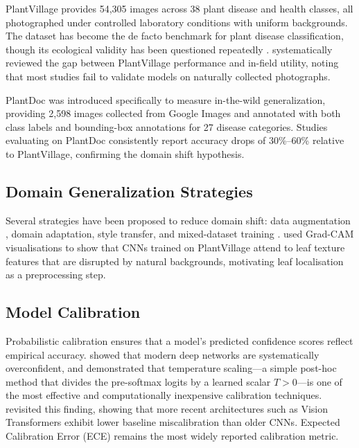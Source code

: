 \documentclass[pdflatex,sn-mathphys-num]{sn-jnl}
\begin{document}
PlantVillage \citep{hughes2015plantvillage} provides 54{,}305 images across 38 plant
disease and health classes, all photographed under controlled laboratory conditions with
uniform backgrounds. The dataset has become the de facto benchmark for plant disease
classification, though its ecological validity has been questioned repeatedly
\citep{barbedo2022review,toda2019deep}. \citet{dsouza2021generalization} systematically
reviewed the gap between PlantVillage performance and in-field utility, noting that most
studies fail to validate models on naturally collected photographs.

PlantDoc \citep{singh2020plant} was introduced specifically to measure in-the-wild
generalization, providing 2{,}598 images collected from Google Images and annotated with
both class labels and bounding-box annotations for 27 disease categories. Studies
evaluating on PlantDoc consistently report accuracy drops of 30\%--60\% relative to
PlantVillage, confirming the domain shift hypothesis.

\subsection{Domain Generalization Strategies}

Several strategies have been proposed to reduce domain shift: data augmentation
\citep{shorten2019survey}, domain adaptation, style transfer, and mixed-dataset
training \citep{kwak2019effect}. \citet{toda2019deep} used Grad-CAM visualisations
\citep{selvaraju2017gradcam} to show that CNNs trained on PlantVillage attend to leaf
texture features that are disrupted by natural backgrounds, motivating leaf localisation
as a preprocessing step.

\subsection{Model Calibration}

Probabilistic calibration ensures that a model's predicted confidence scores reflect
empirical accuracy. \citet{guo2017calibration} showed that modern deep networks are
systematically overconfident, and demonstrated that temperature scaling---a simple
post-hoc method that divides the pre-softmax logits by a learned scalar $T > 0$---is
one of the most effective and computationally inexpensive calibration techniques.
\citet{minderer2021calibration} revisited this finding, showing that more recent
architectures such as Vision Transformers exhibit lower baseline miscalibration than
older CNNs. Expected Calibration Error (ECE) \citep{niculescu2005calibration} remains
the most widely reported calibration metric.
\end{document}
